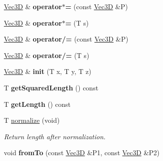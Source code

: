 \begin{DoxyCompactItemize}
\item 
\hypertarget{class_vec3_d_aa571a811b94136ed593f20424b1c599a}{
\hyperlink{class_vec3_d}{Vec3D} \& {\bfseries operator$\ast$=} (const \hyperlink{class_vec3_d}{Vec3D} \&P)}
\label{class_vec3_d_aa571a811b94136ed593f20424b1c599a}

\item 
\hypertarget{class_vec3_d_acaa4425410f744cb0faefeaf6af3eb22}{
\hyperlink{class_vec3_d}{Vec3D} \& {\bfseries operator$\ast$=} (T s)}
\label{class_vec3_d_acaa4425410f744cb0faefeaf6af3eb22}

\item 
\hypertarget{class_vec3_d_a71fb35473004b0bd4d1ef1a8751494fe}{
\hyperlink{class_vec3_d}{Vec3D} \& {\bfseries operator/=} (const \hyperlink{class_vec3_d}{Vec3D} \&P)}
\label{class_vec3_d_a71fb35473004b0bd4d1ef1a8751494fe}

\item 
\hypertarget{class_vec3_d_ae9b46ce6e66c8fc1a654009541d49249}{
\hyperlink{class_vec3_d}{Vec3D} \& {\bfseries operator/=} (T s)}
\label{class_vec3_d_ae9b46ce6e66c8fc1a654009541d49249}

\item 
\hypertarget{class_vec3_d_a44a87f886b32a21b27c5936a8f129c37}{
\hyperlink{class_vec3_d}{Vec3D} \& {\bfseries init} (T x, T y, T z)}
\label{class_vec3_d_a44a87f886b32a21b27c5936a8f129c37}

\item 
\hypertarget{class_vec3_d_a3f3e4665c8caf67d7f7f17ec2abd5f32}{
T {\bfseries getSquaredLength} () const }
\label{class_vec3_d_a3f3e4665c8caf67d7f7f17ec2abd5f32}

\item 
\hypertarget{class_vec3_d_ac11d1b04f2a13be7683cb96264ea2158}{
T {\bfseries getLength} () const }
\label{class_vec3_d_ac11d1b04f2a13be7683cb96264ea2158}

\item 
\hypertarget{class_vec3_d_a111bc7365a05c82d49d0ab77b32aad60}{
T \hyperlink{class_vec3_d_a111bc7365a05c82d49d0ab77b32aad60}{normalize} (void)}
\label{class_vec3_d_a111bc7365a05c82d49d0ab77b32aad60}

\begin{DoxyCompactList}\small\item\em Return length after normalization. \end{DoxyCompactList}\item 
\hypertarget{class_vec3_d_ac7606fe09a194a91afcb371e82d32f5f}{
void {\bfseries fromTo} (const \hyperlink{class_vec3_d}{Vec3D} \&P1, const \hyperlink{class_vec3_d}{Vec3D} \&P2)}
\label{class_vec3_d_ac7606fe09a194a91afcb371e82d32f5f}


\end{DoxyCompactItemize}
